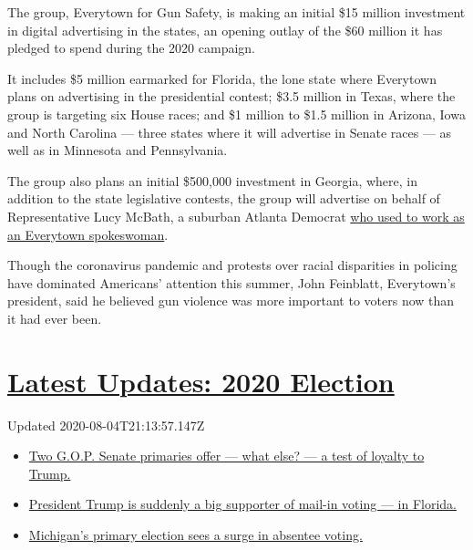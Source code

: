 The group, Everytown for Gun Safety, is making an initial \$15 million
investment in digital advertising in the states, an opening outlay of
the \$60 million it has pledged to spend during the 2020 campaign.

It includes \$5 million earmarked for Florida, the lone state where
Everytown plans on advertising in the presidential contest; \$3.5
million in Texas, where the group is targeting six House races; and \$1
million to \$1.5 million in Arizona, Iowa and North Carolina --- three
states where it will advertise in Senate races --- as well as in
Minnesota and Pennsylvania.

The group also plans an initial \$500,000 investment in Georgia, where,
in addition to the state legislative contests, the group will advertise
on behalf of Representative Lucy McBath, a suburban Atlanta Democrat
\href{https://www.nytimes3xbfgragh.onion/2018/10/24/us/politics/lucy-mcbath-georgia-black-lives-matter.html}{who
used to work as an Everytown spokeswoman}.

Though the coronavirus pandemic and protests over racial disparities in
policing have dominated Americans' attention this summer, John
Feinblatt, Everytown's president, said he believed gun violence was more
important to voters now than it had ever been.

\hypertarget{latest-updates-2020-election}{%
\section{\texorpdfstring{\href{https://www.nytimes3xbfgragh.onion/2020/08/04/us/elections/primary-election-michigan-arizona-kansas.html?action=click\&pgtype=Article\&state=default\&region=MAIN_CONTENT_1\&context=storylines_live_updates}{Latest
Updates: 2020
Election}}{Latest Updates: 2020 Election}}\label{latest-updates-2020-election}}

Updated 2020-08-04T21:13:57.147Z

\begin{itemize}
\tightlist
\item
  \href{https://www.nytimes3xbfgragh.onion/2020/08/04/us/elections/primary-election-michigan-arizona-kansas.html?action=click\&pgtype=Article\&state=default\&region=MAIN_CONTENT_1\&context=storylines_live_updates\#link-3924dd44}{Two
  G.O.P. Senate primaries offer --- what else? --- a test of loyalty to
  Trump.}
\item
  \href{https://www.nytimes3xbfgragh.onion/2020/08/04/us/elections/primary-election-michigan-arizona-kansas.html?action=click\&pgtype=Article\&state=default\&region=MAIN_CONTENT_1\&context=storylines_live_updates\#link-32b39e33}{President
  Trump is suddenly a big supporter of mail-in voting --- in Florida.}
\item
  \href{https://www.nytimes3xbfgragh.onion/2020/08/04/us/elections/primary-election-michigan-arizona-kansas.html?action=click\&pgtype=Article\&state=default\&region=MAIN_CONTENT_1\&context=storylines_live_updates\#link-ab1004d}{Michigan's
  primary election sees a surge in absentee voting.}
\end{itemize}


